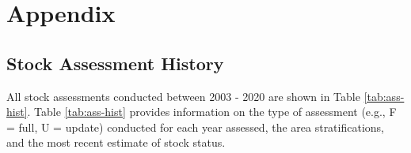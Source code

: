 \documentclass[11pt,
  english,
  a4paper,
]{article}
\begin{document}
\hypertarget{appendix}{%
\section{Appendix}\label{appendix}}

\leavevmode\tagmcend\tagstructend


\hypertarget{stock-assessment-history}{%
\subsection{Stock Assessment History}\label{stock-assessment-history}}

\leavevmode\tagmcend\tagstructend


All stock assessments conducted between 2003 - 2020 are shown in Table \ref{tab:ass-hist}. Table \ref{tab:ass-hist} provides information on the type of assessment (e.g., F = full, U = update) conducted for each year assessed, the area stratifications, and the most recent estimate of stock status.

\leavevmode\tagmcend\tagstructend\par

\begingroup\fontsize{10}{12}\selectfont
\end{document}
